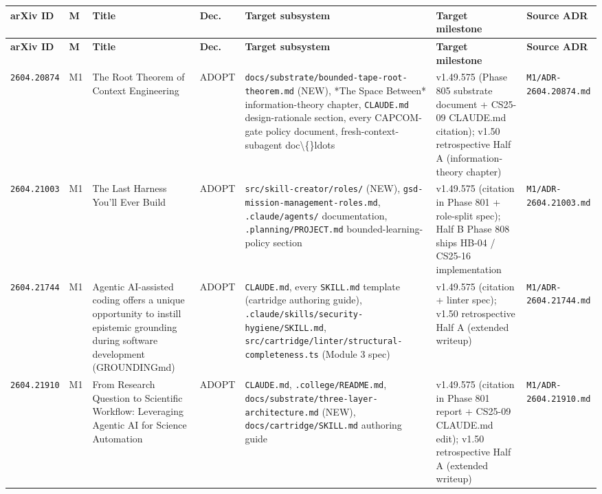 \documentclass[11pt,letterpaper]{article}
\newcommand{\arxivid}[1]{\texttt{\textcolor{accent}{#1}}}
\begin{document}
\begin{footnotesize}
\renewcommand{\arraystretch}{1.15}
\begin{longtable}{@{}L{0.10\textwidth} L{0.025\textwidth} L{0.22\textwidth} L{0.06\textwidth} L{0.20\textwidth} L{0.13\textwidth} L{0.13\textwidth}@{}}
\toprule
\textbf{\sffamily arXiv ID} & \textbf{\sffamily M} & \textbf{\sffamily Title} & \textbf{\sffamily Dec.} & \textbf{\sffamily Target subsystem} & \textbf{\sffamily Target milestone} & \textbf{\sffamily Source ADR} \\
\midrule
\endfirsthead
\toprule
\textbf{\sffamily arXiv ID} & \textbf{\sffamily M} & \textbf{\sffamily Title} & \textbf{\sffamily Dec.} & \textbf{\sffamily Target subsystem} & \textbf{\sffamily Target milestone} & \textbf{\sffamily Source ADR} \\
\midrule
\endhead
\bottomrule
\endfoot
\arxivid{2604.20874} & M1 & The Root Theorem of Context Engineering & ADOPT & \texttt{docs/substrate/bounded-tape-root-theorem.md} (NEW), *The Space Between* information-theory chapter, \texttt{CLAUDE.md} design-rationale section, every CAPCOM-gate policy document, fresh-context-subagent doc\textbackslash\{\}ldots & v1.49.575 (Phase 805 substrate document + CS25-09 CLAUDE.md citation); v1.50 retrospective Half A (information-theory chapter) & \texttt{\small M1/ADR-2604.20874.md} \\
\arxivid{2604.21003} & M1 & The Last Harness You'll Ever Build & ADOPT & \texttt{src/skill-creator/roles/} (NEW), \texttt{gsd-mission-management-roles.md}, \texttt{.claude/agents/} documentation, \texttt{.planning/PROJECT.md} bounded-learning-policy section & v1.49.575 (citation in Phase 801 + role-split spec); Half B Phase 808 ships HB-04 / CS25-16 implementation & \texttt{\small M1/ADR-2604.21003.md} \\
\arxivid{2604.21744} & M1 & Agentic AI-assisted coding offers a unique opportunity to instill epistemic grounding during software development (GROUNDINGmd) & ADOPT & \texttt{CLAUDE.md}, every \texttt{SKILL.md} template (cartridge authoring guide), \texttt{.claude/skills/security-hygiene/SKILL.md}, \texttt{src/cartridge/linter/structural-completeness.ts} (Module 3 spec) & v1.49.575 (citation + linter spec); v1.50 retrospective Half A (extended writeup) & \texttt{\small M1/ADR-2604.21744.md} \\
\arxivid{2604.21910} & M1 & From Research Question to Scientific Workflow: Leveraging Agentic AI for Science Automation & ADOPT & \texttt{CLAUDE.md}, \texttt{.college/README.md}, \texttt{docs/substrate/three-layer-architecture.md} (NEW), \texttt{docs/cartridge/SKILL.md} authoring guide & v1.49.575 (citation in Phase 801 report + CS25-09 CLAUDE.md edit); v1.50 retrospective Half A (extended writeup) & \texttt{\small M1/ADR-2604.21910.md} \\

\end{longtable}
\end{footnotesize}
\end{document}
